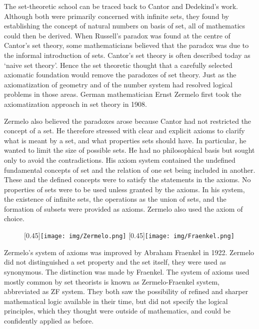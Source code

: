 \documentclass[b5paper]{article}
\begin{document}
The set-theoretic school can be traced back to Cantor and Dedekind's work. Although both were primarily concerned with infinite sets, they found by establishing the concept of natural numbers on basis of set, all of mathematics could then be derived. When Russell's paradox was found at the centre of Cantor's set theory, some mathematicians believed that the paradox was due to the informal introduction of sets. Cantor's set theory is often described today as `naive set theory'. Hence the set theoretic thought that a carefully selected axiomatic foundation would remove the paradoxes of set theory. Just as the axiomatization of geometry and of the number system had resolved logical problems in those areas. German mathematician Ernst Zermelo first took the axiomatization approach in set theory in 1908.

Zermelo also believed the paradoxes arose because Cantor had not restricted the concept of a set. He therefore stressed with clear and explicit axioms to clarify what is meant by a set, and what properties sets should have. In particular, he wanted to limit the size of possible sets. He had no philosophical basis but sought only to avoid the contradictions. His axiom system contained the undefined fundamental concepts of set and the relation of one set being included in another. These and the defined concepts were to satisfy the statements in the axioms. No properties of sets were to be used unless granted by the axioms. In his system, the existence of infinite sets, the operations as the union of sets, and the formation of subsets were provided as axioms. Zermelo also used the axiom of choice\cite{M-Kline-2007}.

\begin{figure}[htbp]
  \centering
  [0.45\linewidth]{\texttt{[image: img/Zermelo.png]}} \quad
  [0.45\linewidth]{\texttt{[image: img/Fraenkel.png]}}
  \captionsetup{labelformat=empty}
  \caption{}
  \label{fig:Zermelo-and-Fraenkel}
\end{figure}

 
Zermelo's system of axioms was improved by Abraham Fraenkel in 1922. Zermelo did not distinguished a set property and the set itself, they were used as synonymous. The distinction was made by Fraenkel. The system of axioms used mostly common by set theorists is known as Zermelo-Fraenkel system, abbreviated as ZF system. They both saw the possibility of refined and sharper mathematical logic available in their time, but did not specify the logical principles, which they thought were outside of mathematics, and could be confidently applied as before\cite{M-Kline-2007}.
\end{document}
